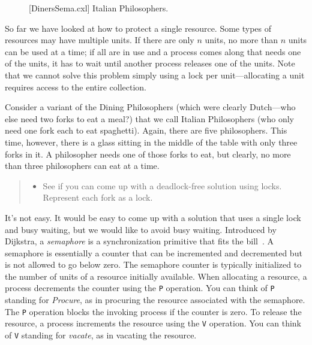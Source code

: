 \documentclass{report}
\newenvironment{code}{
\tcolorbox
}{
\endtcolorbox
}
\begin{document}
\begin{figure}
\begin{code}
\end{code}
\caption{[DinersSema.cxl] Italian Philosophers.}
\label{fig:dinerssema}
\end{figure}

So far we have looked at how to protect a single resource.
Some types of resources may have multiple units.
If there are only $n$ units, no more than $n$ units can be used at a time;
if all are in use and a process comes along that needs one of the units,
it has to wait until another process releases one of the units.
Note that we cannot solve this problem simply using a lock per unit---allocating
a unit requires access to the entire collection.

Consider a variant of the Dining Philosophers (which were clearly Dutch---who
else need two forks to eat a meal?) that we call Italian Philosophers (who only
need one fork each to eat spaghetti).  Again, there are five philosophers.
This time, however, there is a glass sitting in the middle of the table with only
three forks in it.  A philosopher needs one of those forks to eat, but clearly,
no more than three philosophers can eat at a time.

\begin{quote}
\begin{itemize}
\item See if you can come up with a deadlock-free solution using locks.  Represent
    each fork as a lock.
\end{itemize}
\end{quote}

It's not easy.  It would be easy to come up with a solution that uses a single lock
and busy waiting, but we would like to avoid busy waiting.
Introduced by Dijkstra,
a \emph{semaphore} is a synchronization primitive that fits the bill~\cite{EWD35}.
A semaphore is essentially
a counter that can be incremented and decremented but is not allowed to go
below zero.  The semaphore counter is typically initialized to the number of
units of a resource initially available.
When allocating a resource, a process decrements the
counter using the \texttt{P}
operation.  You can think of \texttt{P} standing
for \emph{Procure}, as in procuring the resource associated with the semaphore.
The \texttt{P} operation blocks the invoking process if the counter is zero.
To release the resource, a process increments the resource using the
\texttt{V}
operation.  You can think of \texttt{V} standing for \emph{vacate},
as in vacating the resource.
\end{document}
